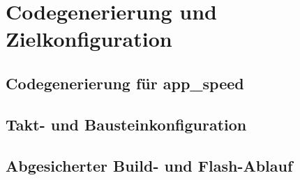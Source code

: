 \chapter{Codegenerierung und Zielkonfiguration}
\label{ch:codegen}

\section{Codegenerierung für app\_speed}

\section{Takt- und Bausteinkonfiguration}

\section{Abgesicherter Build- und Flash-Ablauf}
